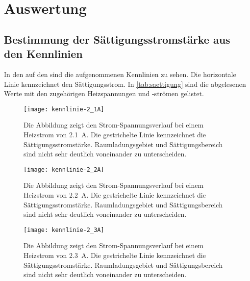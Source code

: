 
\section{Auswertung}

\subsection{Bestimmung der Sättigungsstromstärke aus den Kennlinien}

In den  auf den
 sind die
aufgenommenen Kennlinien zu sehen. Die horizontale Linie kennzeichnet
den Sättigungsstrom. In \cref{tab:saettigung} sind die abgelesenen Werte
mit den zugehörigen Heizspannungen und -strömen gelistet.

\begin{figure}
  \centering
  \texttt{[image: kennlinie-2\_1A]}
  \caption{Die Abbildung zeigt den Strom-Spannungsverlauf bei einem
    Heizstrom von \SI{2.1}{\ampere}. Die gestrichelte Linie kennzeichnet
  die Sättigungsstromstärke. Raumladungsgebiet und Sättigungsbereich
  sind nicht sehr deutlich voneinander zu unterscheiden.}
  \label{fig:kennlinie-2.1A}
\end{figure}

\begin{figure}
  \centering
  \texttt{[image: kennlinie-2\_2A]}
  \caption{Die Abbildung zeigt den Strom-Spannungsverlauf bei einem
    Heizstrom von \SI{2.2}{\ampere}. Die gestrichelte Linie kennzeichnet
    die Sättigungsstromstärke. Raumladungsgebiet und Sättigungsbereich
    sind nicht sehr deutlich voneinander zu unterscheiden.}
  \label{fig:kennlinie-2.2A}
\end{figure}

\begin{figure}
  \centering
  \texttt{[image: kennlinie-2\_3A]}
  \caption{Die Abbildung zeigt den Strom-Spannungsverlauf bei einem
    Heizstrom von \SI{2.3}{\ampere}. Die gestrichelte Linie kennzeichnet
    die Sättigungsstromstärke. Raumladungsgebiet und Sättigungsbereich
    sind nicht sehr deutlich voneinander zu unterscheiden.}
  \label{fig:kennlinie-2.3A}
\end{figure}

